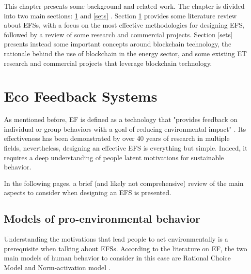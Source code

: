\cleardoublepage
\label{chap:back}

This chapter presents some background and related work. The chapter is divided into two main sections: \ref{sefs}  and \ref{sets} . Section \ref{sefs}  provides some literature review about \acp{EFS}, with a focus on the most effective methodologies for designing \ac{EFS}, followed by a review of some research and commercial projects. Section \ref{sets} presents instead some important concepts around blockchain technology, the rationale behind the use of blockchain in the energy sector, and some existing \ac{ET} research and commercial projects that leverage blockchain technology.


\section{Eco Feedback Systems} \label{sefs}

As mentioned before, \ac{EF} is defined as a technology that "provides feedback on individual or group behaviors with a goal of reducing environmental impact" \cite{Froehlich2010}. Its effectiveness has been demonstrated by over 40 years of research in multiple fields, nevertheless, designing an effective \ac{EFS} is everything but simple. Indeed, it requires a deep understanding of people latent motivations for sustainable behavior.


In the following pages, a brief (and likely not comprehensive) review of the main aspects to consider when designing an \ac{EFS} is presented.


\subsection{Models of pro-environmental behavior}

Understanding the motivations that lead people to act environmentally is a prerequisite when talking about \acp{EFS}. According to the literature on \ac{EF}, the two main models of human behavior to consider in this case are Rational Choice Model and Norm-activation model \cite{Froehlich2010}.


